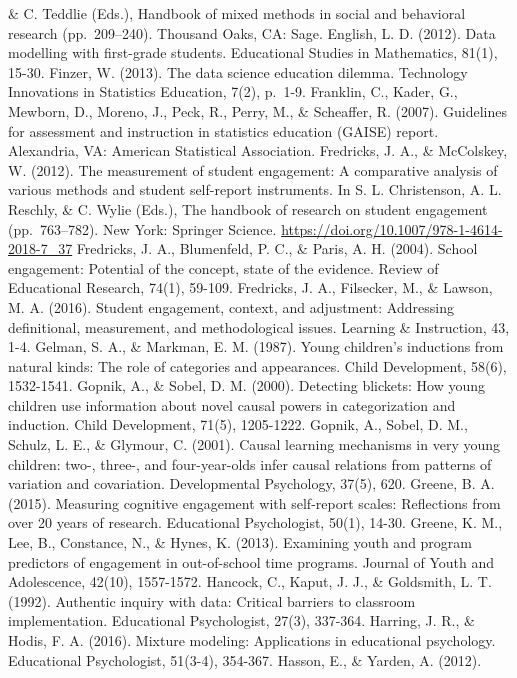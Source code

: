 \documentclass[]{msu-thesis}
\theoremstyle{definition}
\theoremstyle{definition}
\theoremstyle{definition}
\theoremstyle{remark}
\begin{document}
\& C. Teddlie (Eds.), Handbook of mixed methods in social and behavioral
research (pp.~209--240). Thousand Oaks, CA: Sage. English, L. D. (2012).
Data modelling with first-grade students. Educational Studies in
Mathematics, 81(1), 15-30. Finzer, W. (2013). The data science education
dilemma. Technology Innovations in Statistics Education, 7(2), p.~1-9.
Franklin, C., Kader, G., Mewborn, D., Moreno, J., Peck, R., Perry, M.,
\& Scheaffer, R. (2007). Guidelines for assessment and instruction in
statistics education (GAISE) report. Alexandria, VA: American
Statistical Association. Fredricks, J. A., \& McColskey, W. (2012). The
measurement of student engagement: A comparative analysis of various
methods and student self-report instruments. In S. L. Christenson, A. L.
Reschly, \& C. Wylie (Eds.), The handbook of research on student
engagement (pp.~763--782). New York: Springer Science.
\url{https://doi.org/10.1007/978-1-4614-2018-7_37} Fredricks, J. A.,
Blumenfeld, P. C., \& Paris, A. H. (2004). School engagement: Potential
of the concept, state of the evidence. Review of Educational Research,
74(1), 59-109. Fredricks, J. A., Filsecker, M., \& Lawson, M. A. (2016).
Student engagement, context, and adjustment: Addressing definitional,
measurement, and methodological issues. Learning \& Instruction, 43,
1-4. Gelman, S. A., \& Markman, E. M. (1987). Young children's
inductions from natural kinds: The role of categories and appearances.
Child Development, 58(6), 1532-1541. Gopnik, A., \& Sobel, D. M. (2000).
Detecting blickets: How young children use information about novel
causal powers in categorization and induction. Child Development, 71(5),
1205-1222. Gopnik, A., Sobel, D. M., Schulz, L. E., \& Glymour, C.
(2001). Causal learning mechanisms in very young children: two-, three-,
and four-year-olds infer causal relations from patterns of variation and
covariation. Developmental Psychology, 37(5), 620. Greene, B. A. (2015).
Measuring cognitive engagement with self-report scales: Reflections from
over 20 years of research. Educational Psychologist, 50(1), 14-30.
Greene, K. M., Lee, B., Constance, N., \& Hynes, K. (2013). Examining
youth and program predictors of engagement in out-of-school time
programs. Journal of Youth and Adolescence, 42(10), 1557-1572. Hancock,
C., Kaput, J. J., \& Goldsmith, L. T. (1992). Authentic inquiry with
data: Critical barriers to classroom implementation. Educational
Psychologist, 27(3), 337-364. Harring, J. R., \& Hodis, F. A. (2016).
Mixture modeling: Applications in educational psychology. Educational
Psychologist, 51(3-4), 354-367. Hasson, E., \& Yarden, A. (2012).
\end{document}
